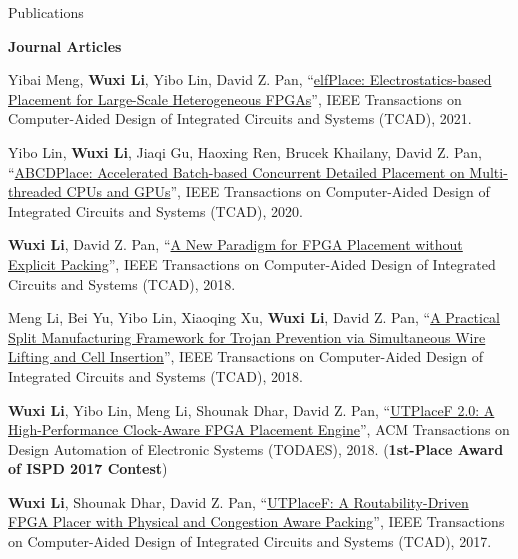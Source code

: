 \begin{rSection}{Publications}

\textbf{Journal Articles}
\begin{description}[font=\normalfont]
\item[{[J7]}]{
    Yibai Meng, \textbf{Wuxi Li}, Yibo Lin, David Z. Pan,
    ``\href{https://ieeexplore.ieee.org/abstract/document/9330804}{elfPlace: Electrostatics-based Placement for Large-Scale Heterogeneous FPGAs}'',
    IEEE Transactions on Computer-Aided Design of Integrated Circuits and Systems (TCAD), 2021.
}

\item[{[J6]}]{
    Yibo Lin, \textbf{Wuxi Li}, Jiaqi Gu, Haoxing Ren, Brucek Khailany, David Z. Pan,
    ``\href{https://ieeexplore.ieee.org/document/8982049}{ABCDPlace: Accelerated Batch-based Concurrent Detailed Placement on Multi-threaded CPUs and GPUs}'',
    IEEE Transactions on Computer-Aided Design of Integrated Circuits and Systems (TCAD), 2020.
}

\item[{[J5]}]{
    \textbf{Wuxi Li}, David Z. Pan,
    ``\href{https://ieeexplore.ieee.org/document/8500228/}{A New Paradigm for FPGA Placement without Explicit Packing}'',
    IEEE Transactions on Computer-Aided Design of Integrated Circuits and Systems (TCAD), 2018.
}

\item[{[J4]}]{
    Meng Li, Bei Yu, Yibo Lin, Xiaoqing Xu, \textbf{Wuxi Li}, David Z. Pan,
    ``\href{https://ieeexplore.ieee.org/document/8419279/}{A Practical Split Manufacturing Framework for Trojan Prevention via Simultaneous Wire Lifting and Cell Insertion}'',
    IEEE Transactions on Computer-Aided Design of Integrated Circuits and Systems (TCAD), 2018.
}

\item[{[J3]}]{
    \textbf{Wuxi Li}, Yibo Lin, Meng Li, Shounak Dhar, David Z. Pan,
    ``\href{https://dl.acm.org/citation.cfm?id=3174849}{UTPlaceF 2.0: A High-Performance Clock-Aware FPGA Placement Engine}'',
    ACM Transactions on Design Automation of Electronic Systems (TODAES), 2018.
    (\textbf{1st-Place Award of ISPD 2017 Contest})
}

\item[{[J2]}]{
    \textbf{Wuxi Li}, Shounak Dhar, David Z. Pan,
    ``\href{http://ieeexplore.ieee.org/document/7984833/}{UTPlaceF: A Routability-Driven FPGA Placer with Physical and Congestion Aware Packing}'',
    IEEE Transactions on Computer-Aided Design of Integrated Circuits and Systems (TCAD), 2017.
}


\end{description}
\end{rSection}
